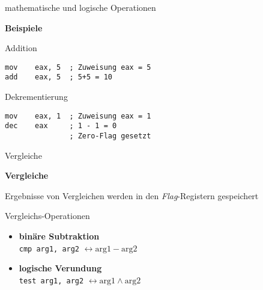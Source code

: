 \begin{frame}[fragile]{mathematische und logische Operationen}

\begin{center}
\textbf{Beispiele}
\end{center}

Addition
\begin{lstlisting}
mov    eax, 5  ; Zuweisung eax = 5
add    eax, 5  ; 5+5 = 10 
\end{lstlisting}

\makebox{}

Dekrementierung
\begin{lstlisting}
mov    eax, 1  ; Zuweisung eax = 1
dec    eax     ; 1 - 1 = 0
               ; Zero-Flag gesetzt
\end{lstlisting}

\end{frame}

\begin{frame}{Vergleiche}

\begin{center}
\textbf{Vergleiche}
\end{center}

Ergebnisse von Vergleichen werden in den \textit{Flag}-Registern gespeichert

\makebox{}

Vergleichs-Operationen
\begin{itemize}
	\item \textbf{binäre Subtraktion}\\
		\texttt{cmp arg1, arg2} $\leftrightarrow \text{arg1} - \text{arg2}$

	\item \textbf{logische Verundung}\\
		\texttt{test arg1, arg2} $\leftrightarrow \text{arg1} \wedge \text{arg2}$
\end{itemize}
\end{frame}

